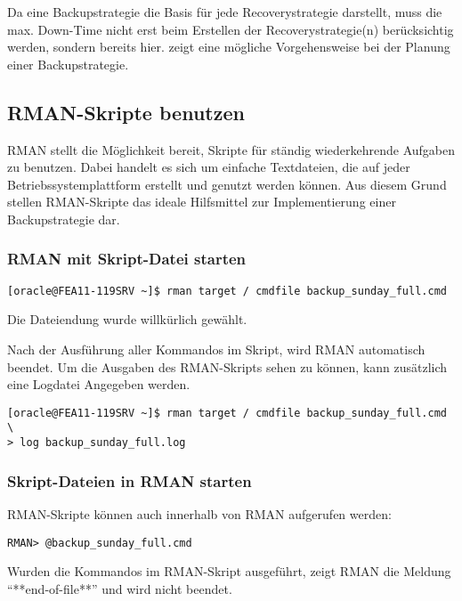           Da eine Backupstrategie die Basis f\"ur jede Recoverystrategie darstellt, muss die max. Down-Time nicht erst beim Erstellen der Recoverystrategie(n) ber\"ucksichtig werden, sondern bereits hier.
           zeigt eine m\"ogliche Vorgehensweise bei der Planung einer Backupstrategie.
\clearpage
      \subsection{RMAN-Skripte benutzen}
        RMAN stellt die M\"oglichkeit bereit, Skripte f\"ur st\"andig wiederkehrende Aufgaben zu benutzen. Dabei handelt es sich um einfache Textdateien, die auf jeder Betriebssystemplattform erstellt und genutzt werden k\"onnen. Aus diesem Grund stellen RMAN-Skripte das ideale Hilfsmittel zur Implementierung einer Backupstrategie dar.
        \subsubsection{RMAN mit Skript-Datei starten}
          \begin{lstlisting}[caption={Aufrund eines RMAN-Skripts},label=admin1359,language=rman]
[oracle@FEA11-119SRV ~]$ rman target / cmdfile backup_sunday_full.cmd
          \end{lstlisting}
          \begin{merke}
            Die Dateiendung  wurde willk\"urlich gew\"ahlt.
          \end{merke}
          Nach der Ausf\"uhrung aller Kommandos im Skript, wird RMAN automatisch beendet. Um die Ausgaben des RMAN-Skripts sehen zu k\"onnen, kann zus\"atzlich eine Logdatei Angegeben werden.
          \begin{lstlisting}[caption={RMAN-Skript mit Log-Datei benutzen},label=admin1360,language=terminal]
[oracle@FEA11-119SRV ~]$ rman target / cmdfile backup_sunday_full.cmd \
> log backup_sunday_full.log
          \end{lstlisting}
        \subsubsection{Skript-Dateien in RMAN starten}
          RMAN-Skripte k\"onnen auch innerhalb von RMAN aufgerufen werden:
          \begin{lstlisting}[caption={Ein Skript-Datei in RMAN aufrufen},label=admin1361,language=rman]
RMAN> @backup_sunday_full.cmd
        \end{lstlisting}
          Wurden die Kommandos im RMAN-Skript ausgef\"uhrt, zeigt RMAN die Meldung \enquote{**end-of-file**} und wird nicht beendet.
